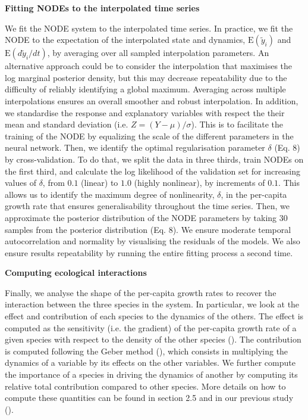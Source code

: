 \documentclass[11pt, oneside]{article}
\begin{document}
\textbf{Fitting NODEs to the interpolated time series}

We fit the NODE system to the interpolated time series.
In practice, we fit the NODE to the expectation of the interpolated state and dynamics, $\mathrm{E}(\tilde{y}_i)$ and $\mathrm{E}(d\tilde{y}_i/dt)$, by averaging over all sampled interpolation parameters.
An alternative approach could be to consider the interpolation that maximises the log marginal posterior density, but this may decrease repeatability due to the difficulty of reliably identifying a global maximum.
Averaging across multiple interpolations ensures an overall smoother and robust interpolation. 
In addition, we standardise the response and explanatory variables with respect the their mean and standard deviation (i.e. $Z=(Y-\mu)/\sigma$).
This is to facilitate the training of the NODE by equalizing the scale of the different parameters in the neural network.
Then, we identify the optimal regularisation parameter $\delta$ (Eq. 8) by cross-validation.
To do that, we split the data in three thirds, train NODEs on the first third, and calculate the log likelihood of the validation set for increasing values of $\delta$, from $0.1$ (linear) to $1.0$ (highly nonlinear), by increments of $0.1$.
This allows us to identify the maximum degree of nonlinearity, $\delta$, in the per-capita growth rate that ensures generalisability throughout the time series.
Then, we approximate the posterior distribution of the NODE parameters by taking 30 samples from the posterior distribution (Eq. 8).
We ensure moderate temporal autocorrelation and normality by visualising the residuals of the models.
We also ensure results repeatability by running the entire fitting process a second time.

\textbf{Computing ecological interactions}

Finally, we analyse the shape of the per-capita growth rates to recover the interaction between the three species in the system.
In particular, we look at the effect and contribution of each species to the dynamics of the others.
The effect is computed as the sensitivity (i.e. the gradient) of the per-capita growth rate of a given species with respect to the density of the other species (\cite{Sugihara2012,Bonnaffe2021a}).
The contribution is computed following the Geber method (\cite{Hairston2005}), which consists in multiplying the dynamics of a variable by its effects on the other variables.
We further compute the importance of a species in driving the dynamics of another by computing its relative total contribution compared to other species.
More details on how to compute these quantities can be found in section 2.5 and in our previous study (\cite{Bonnaffe2021a}).
\end{document}
